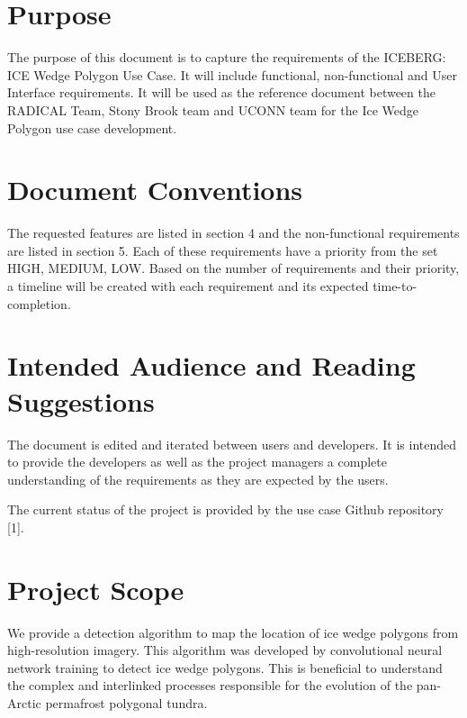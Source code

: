 \documentclass{scrreprt}
\begin{document}
\section{Purpose}
The purpose of this document is to capture the requirements of the ICEBERG: ICE Wedge Polygon
Use Case. It will include functional, non-functional and User Interface requirements.
It will be used as the reference document between the RADICAL Team, Stony 
Brook team and UCONN team for the Ice Wedge Polygon use case development.

\section{Document Conventions}
The requested features are listed in section 4 and the non-functional requirements are
listed in section 5. Each of these requirements have a priority from the set {HIGH,
MEDIUM, LOW}. Based on the number of requirements and their priority, a timeline
will be created with each requirement and its expected time-to-completion.

\section{Intended Audience and Reading Suggestions}

The document is edited and iterated between users and developers. It is intended
to provide the developers as well as the project managers a complete understanding 
of the requirements as they are expected by the users.

The current status of the project 
is provided by the use case Github repository [1].

\section{Project Scope}
\iffalse
$<$Provide a short description of the software being specified and its purpose, 
including relevant benefits, objectives, and goals. Relate the software to 
corporate goals or business strategies. If a separate vision and scope document 
is available, refer to it rather than duplicating its contents here.$>$
\fi
We provide a detection algorithm to map the location of ice wedge polygons from high-resolution 
imagery. This algorithm was developed by convolutional neural network training to 
detect ice wedge polygons. This is beneficial to understand the complex and 
interlinked processes responsible for the evolution of the pan-Arctic permafrost polygonal tundra.
\end{document}
